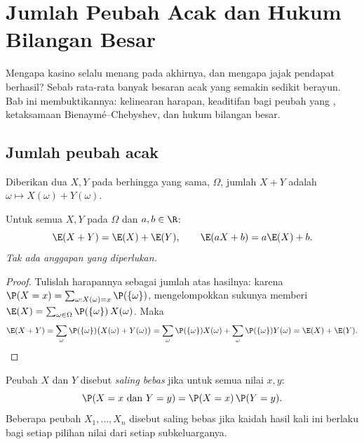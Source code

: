 \chapter{Jumlah Peubah Acak dan Hukum Bilangan Besar}\label{ch:g12:sums}

Mengapa kasino selalu menang pada akhirnya, dan mengapa jajak pendapat berhasil? Sebab
rata-rata banyak besaran acak yang  semakin sedikit berayun. Bab
ini membuktikannya: kelinearan harapan, keaditifan  bagi peubah
yang , ketaksamaan Bienaymé--Chebyshev, dan hukum bilangan
besar.

\section{Jumlah peubah acak}

Diberikan dua  $X, Y$ pada  berhingga yang sama,
$\Omega$, jumlah $X + Y$ adalah 
$\omega \mapsto X(\omega) + Y(\omega)$.

\begin{theorem}\label{thm:g12:sums:linearity}
Untuk semua  $X, Y$ pada $\Omega$ dan $a, b \in \R$:
\[
\E(X + Y) = \E(X) + \E(Y), \qquad \E(aX + b) = a\E(X) + b .
\]
\emph{Tak ada anggapan  yang diperlukan.}
\end{theorem}

\begin{proof}
Tulislah harapannya sebagai jumlah atas hasilnya: karena
$\P(X = x) = \sum_{\omega : X(\omega) = x} \P(\{\omega\})$, mengelompokkan sukunya
memberi $\E(X) = \sum_{\omega \in \Omega} \P(\{\omega\})\,X(\omega)$. Maka
\[
\E(X + Y) = \sum_{\omega} \P(\{\omega\})\bigl(X(\omega) + Y(\omega)\bigr)
= \sum_{\omega} \P(\{\omega\})X(\omega)
+ \sum_{\omega} \P(\{\omega\})Y(\omega) = \E(X) + \E(Y). \qedhere
\]
\end{proof}

\begin{definition}\label{def:g12:sums:indep}
Peubah $X$ dan $Y$ disebut \emph{saling bebas} jika
untuk semua nilai $x, y$:
\[
\P(X = x \text{ dan } Y = y) = \P(X = x)\,\P(Y = y).
\]
Beberapa peubah $X_1, \dots, X_n$ disebut saling bebas jika kaidah hasil kali ini
berlaku bagi setiap pilihan nilai dari setiap subkeluarganya.
\end{definition}

